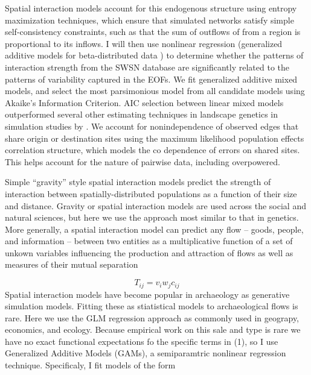 \documentclass[11pt]{wlscirep}
\begin{document}
Spatial interaction models account for this endogenous structure using entropy maximization techniques, which ensure that simulated networks satisfy simple self-consistency constraints, such as that the sum of outflows of from a region is proportional to its inflows.
I will then use nonlinear regression (generalized additive models for beta-distributed data \cite{Wood2006a}) to determine whether the patterns of interaction strength from the SWSN database are significantly related to the patterns of variability captured in the EOFs.
We fit generalized additive mixed models, and select the most parsimonious model from all candidate models using Akaike's Information Criterion. AIC selection between linear mixed models outperformed several other estimating techniques in landscape genetics in simulation studies by \cite{Shirk et al 2018}. We account for nonindependence of observed edges that share origin or destination sites using the maximum likelihood population effects correlation structure, which models the co dependence of errors on shared sites. This helps account for the nature of pairwise data, including overpowered.


Simple ``gravity'' style spatial interaction models predict the strength of interaction between spatially-distributed populations as a function of their size and distance. Gravity or spatial interaction models are used across the social and natural sciences, but here we use the approach most similar to that in genetics. More generally, a spatial interaction model can predict any flow -- goods, people, and information -- between two entities as a multiplicative function of a set of unkown variables influencing the production and attraction of flows as well as measures of their mutual separation

\begin{equation}
    T_{ij} = v_iw_jc_{ij}
\end{equation}
Spatial interaction models have become popular in archaeology as generative simulation models. Fitting these as stiatistical models to archaeological flows is rare. Here we use the GLM regression approach as commonly used in geograpy, economics, and ecology. Because empirical work on this sale and type is rare we have no exact functional expectations fo the specific terms in (1), so I use Generalized Additive Models (GAMs), a semiparamtric nonlinear regression technique. Specificaly, I fit models of the form
\end{document}
